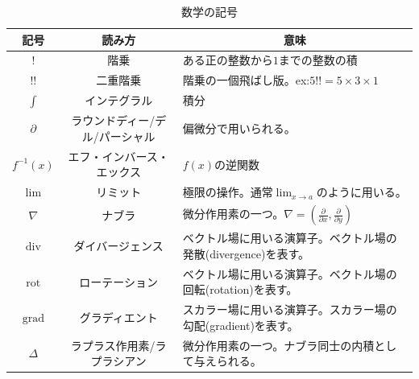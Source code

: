 \documentclass[a4j,dvipdfmx]{jsarticle}
\begin{document}
\begin{table}[h]
                    \caption*{数学の記号}
                    \centering
                    \begin{tabular}{|c|c|l|}\hline
                        記号 & 読み方 & \multicolumn{1}{c|}{意味}\\\hline
                        $!$ & 階乗 & ある正の整数から$1$までの整数の積\\\hline
                        $!!$ & 二重階乗 & 階乗の一個飛ばし版。ex:\hspace{1mm}$5!!=5\times3\times1$\\\hline
                        $\int$ & インテグラル & 積分 \\\hline
                        $\partial$ & ラウンドディー/デル/パーシャル & 偏微分で用いられる。\\\hline
                        $f^{-1}(x)$ & エフ・インバース・エックス & $f(x)$の逆関数\\\hline
                        $\lim$ & リミット & 極限の操作。通常$\displaystyle\lim_{x\to a}$のように用いる。\\\hline
                        $\nabla$ & ナブラ & 微分作用素の一つ。$\nabla=\left(\frac{\partial}{\partial x},\frac{\partial}{\partial y}\right)$\\\hline
                        $\mathrm{div}$ & ダイバージェンス & ベクトル場に用いる演算子。ベクトル場の発散(divergence)を表す。\\\hline
                        $\mathrm{rot}$ & ローテーション & ベクトル場に用いる演算子。ベクトル場の回転(rotation)を表す。\\\hline
                        $\mathrm{grad}$ & グラディエント & スカラー場に用いる演算子。スカラー場の勾配(gradient)を表す。\\\hline
                        $\varDelta$ & ラプラス作用素/ラプラシアン & 微分作用素の一つ。ナブラ同士の内積として与えられる。\\\hline
                    \end{tabular}
                \end{table}
        \clearpage

        \thispagestyle{fancy}
        \fancyhead{}
\end{document}
